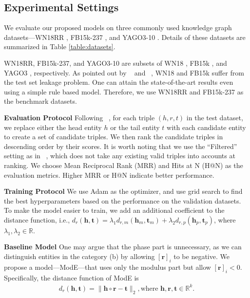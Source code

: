 \documentclass[letterpaper]{article} \usepackage{aaai20}  \usepackage{times}  \usepackage{helvet} \usepackage{courier}  \usepackage[hyphens]{url}  \usepackage{graphicx} \urlstyle{rm} \def\UrlFont{\rm}  \usepackage{graphicx}  \frenchspacing  \setlength{\pdfpagewidth}{8.5in}  \setlength{\pdfpageheight}{11in}
\newcommand{\citet}[1]{\citeauthor{#1}~\shortcite{#1}}
\newcommand{\citep}{\cite}
\begin{document}
\subsection{Experimental Settings}
We evaluate our proposed models on three commonly used knowledge graph datasets---WN18RR \citep{wn18rr}, FB15k-237 \citep{conve}, and YAGO3-10 \citep{yago3}. Details of these datasets are summarized in Table \ref{table:datasets}.

WN18RR, FB15k-237, and YAGO3-10 are subsets of WN18 \citep{transe}, FB15k \citep{transe}, and YAGO3 \citep{yago3}, respectively.
As pointed out by \citet{wn18rr} and \citet{conve}, WN18 and FB15k suffer from the test set leakage problem. One can attain the state-of-the-art results even using a simple rule based model. Therefore, we use WN18RR and FB15k-237 as the benchmark datasets. 

\noindent\textbf{Evaluation Protocol} Following \citet{transe}, for each triple $(h,r,t)$ in the test dataset, we replace either the head entity $h$ or the tail entity $t$ with each candidate entity to create a set of candidate triples. We then rank the candidate triples in descending order by their scores. It is worth noting that we use the ``Filtered'' setting as in \citet{transe}, which does not take any existing valid triples into accounts at ranking. We choose Mean Reciprocal Rank (MRR) and Hits at N (H@N) as the evaluation metrics. Higher MRR or H@N indicate better performance. 

\noindent\textbf{Training Protocol} We use Adam \citep{adam} as the optimizer, and use grid search to find the best hyperparameters based on the performance on the validation datasets. To make the model easier to train, we add an additional coefficient to the distance function, i.e., $d_{r}(\textbf{h},\textbf{t})=\lambda_1d_{r,m}(\textbf{h}_m,\textbf{t}_m)+\lambda_2 d_{r,p}(\textbf{h}_p,\textbf{t}_p)$, where $\lambda_1,\lambda_2\in \mathbb{R}$. 

\noindent\textbf{Baseline Model} One may argue that the phase part is unnecessary, as we can distinguish entities in the category (b) by allowing $[\textbf{r}]_i$ to be negative. We propose a model---ModE---that uses only the modulus part but allow $[\textbf{r}]_i<0$. Specifically, the distance function of ModE is
\begin{align*}
    d_r(\textbf{h},\textbf{t})=\|\textbf{h}\circ \textbf{r}-\textbf{t}\|_2, \text{where } \textbf{h},\textbf{r},\textbf{t}\in\mathbb{R}^k.
\end{align*}
\end{document}
